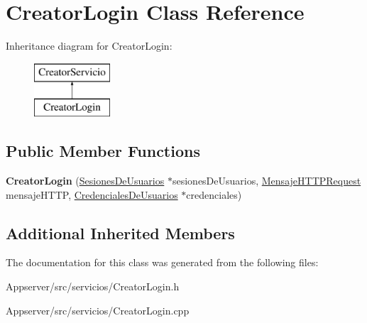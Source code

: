 \hypertarget{classCreatorLogin}{}\section{Creator\+Login Class Reference}
\label{classCreatorLogin}
Inheritance diagram for Creator\+Login\+:\begin{figure}[H]
\begin{center}
\leavevmode
\includegraphics[height=2.000000cm]{classCreatorLogin}
\end{center}
\end{figure}
\subsection*{Public Member Functions}
\begin{DoxyCompactItemize}
\item 
{\bfseries Creator\+Login} (\hyperlink{classSesionesDeUsuarios}{Sesiones\+De\+Usuarios} $\ast$sesiones\+De\+Usuarios, \hyperlink{classMensajeHTTPRequest}{Mensaje\+H\+T\+T\+P\+Request} mensaje\+H\+T\+TP, \hyperlink{classCredencialesDeUsuarios}{Credenciales\+De\+Usuarios} $\ast$credenciales)\hypertarget{classCreatorLogin_aacbb6757418fff2e4ac679faef158120}{}\label{classCreatorLogin_aacbb6757418fff2e4ac679faef158120}

\end{DoxyCompactItemize}
\subsection*{Additional Inherited Members}


The documentation for this class was generated from the following files\+:\begin{DoxyCompactItemize}
\item 
Appserver/src/servicios/Creator\+Login.\+h\item 
Appserver/src/servicios/Creator\+Login.\+cpp\end{DoxyCompactItemize}
